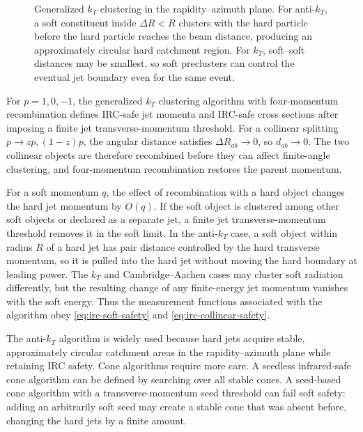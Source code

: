 \begin{figure}[H]
{
  }
  \caption{Generalized \(k_T\) clustering in the rapidity--azimuth plane.  For
  anti-\(k_T\), a soft constituent inside \(\Delta R<R\) clusters with the
  hard particle before the hard particle reaches the beam distance, producing
  an approximately circular hard catchment region.  For \(k_T\), soft--soft
  distances may be smallest, so soft preclusters can control the eventual jet
  boundary even for the same event.}
  \label{fig:jets-measurement-irc-flow}
\end{figure}

For \(p=1,0,-1\), the generalized \(k_T\) clustering algorithm with
four-momentum recombination defines IRC-safe jet momenta and IRC-safe
cross sections after imposing a finite jet transverse-momentum threshold.
For a collinear splitting \(p\to zp,(1-z)p\), the angular distance satisfies
\(\Delta R_{ab}\to0\), so \(d_{ab}\to0\).  The two collinear objects are
therefore recombined before they can affect finite-angle clustering, and
four-momentum recombination restores the parent momentum.

For a soft momentum \(q\), the effect of recombination with a hard object
changes the hard jet momentum by \(O(q)\).  If the soft object is clustered
among other soft objects or declared as a separate jet, a finite jet
transverse-momentum threshold removes it in the soft limit.  In the anti-\(k_T\)
case, a soft object within radius \(R\) of a hard jet has pair distance
controlled by the hard transverse momentum, so it is pulled into the hard jet
without moving the hard boundary at leading power.  The \(k_T\) and
Cambridge--Aachen cases may cluster soft radiation differently, but the
resulting change of any finite-energy jet momentum vanishes with the soft
energy.  Thus the measurement functions associated with the algorithm obey
\eqref{eq:irc-soft-safety} and \eqref{eq:irc-collinear-safety}.

The anti-\(k_T\) algorithm is widely used because hard jets acquire stable,
approximately circular catchment areas in the rapidity--azimuth plane while
retaining IRC safety.  Cone algorithms require more care.  A seedless
infrared-safe cone algorithm can be defined by searching over all stable
cones.  A seed-based cone algorithm with a transverse-momentum seed threshold
can fail soft safety: adding an arbitrarily soft seed may create a stable cone
that was absent before, changing the hard jets by a finite amount.

